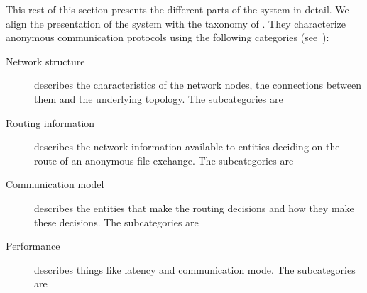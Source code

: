 This rest of this section presents the different parts of the system in detail.
We align the presentation of the system with the taxonomy of 
\textcite{RoutingSurveyAnonymousProtocols}.
They characterize anonymous communication protocols using the following 
categories (see~\cite[Table 1]{RoutingSurveyAnonymousProtocols}):
\begin{description}
  \item[Network structure]
    describes the characteristics of the network nodes, the connections between 
    them and the underlying topology.
    The subcategories are

  \item[Routing information]
    describes the network information available to entities deciding on 
    the route of an anonymous file exchange.
    The subcategories are

  \item[Communication model]
    describes the entities that make the routing decisions and how they 
    make these decisions.
    The subcategories are

  \item[Performance]
    describes things like latency and communication mode.
    The subcategories are
\end{description}

